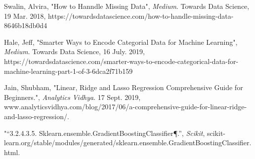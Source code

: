\documentclass[letterpaper,10pt]{article}
\begin{document}
\begin{thebibliography}{999}

Swalin, Alvira,
"How to Hanndle Missing Data",
\emph{Medium}.
Towards Data Science, 19 Mar. 2018,
https://towardsdatascience.com/how-to-handle-missing-data-8646b18db0d4
  
Hale, Jeff,
"Smarter Ways to Encode Categorial Data for Machine Learning",
\emph{Medium}.
Towards Data Science, 16 July. 2019,
https://towardsdatascience.com/smarter-ways-to-encode-categorical-data-for-machine-learning-part-1-of-3-6dca2f71b159

Jain, Shubham,
"Linear, Ridge and Lasso Regression Comprehensive Guide for Beginners.",
\emph{Analytics Vidhya}.
17 Sept. 2019, www.analyticsvidhya.com/blog/2017/06/a-comprehensive-guide-for-linear-ridge-and-lasso-regression/.

"“3.2.4.3.5. Sklearn.ensemble.GradientBoostingClassifier¶.”,
\emph{Scikit}, 
scikit-learn.org/stable/modules/generated/sklearn.ensemble.GradientBoostingClassifier.html.

\end{thebibliography}
\end{document}

